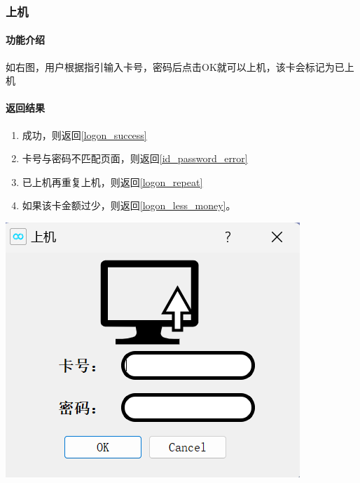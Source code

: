 \documentclass{article}
\begin{document}
    \subsubsection{上机}
    \begin{minipage}[h]{0.5\linewidth}
        \paragraph{功能介绍}
        如右图，用户根据指引输入卡号，密码后点击OK就可以上机，该卡会标记为已上机
        \vfill
        \paragraph{返回结果}
        \begin{enumerate}
            \item 成功，则返回\ref{logon_success}
            \item 卡号与密码不匹配页面，则返回\ref{id_password_error}
            \item 已上机再重复上机，则返回\ref{logon_repeat}
            \item 如果该卡金额过少，则返回\ref{logon_less_money}。
        \end{enumerate}
    \end{minipage}
    \begin{minipage}[h]{0.5\linewidth}
        \centering
        \includegraphics[scale=0.6]{figure/logon.png}
        \label{logon}
    \end{minipage}
\end{document}
